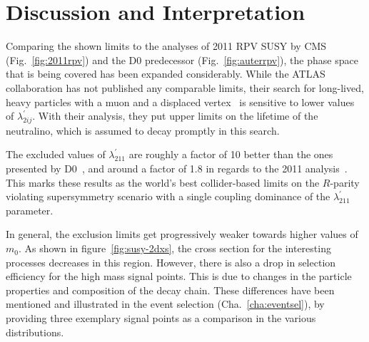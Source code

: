 \section{Discussion and Interpretation}
\label{sec:discussion}

Comparing the shown limits to the analyses of 2011 RPV SUSY by CMS (Fig.~\ref{fig:2011rpv}) and the D0 predecessor (Fig.~\ref{fig:auterrpv}), the phase space that is being covered has been expanded considerably. While the ATLAS collaboration has not published any comparable limits, their search for long-lived, heavy particles with a muon and a displaced vertex~\cite{atlasrpv} is sensitive to lower values of $\lambda^\prime_{2ij}$. With their analysis, they put upper limits on the lifetime of the neutralino, which is assumed to decay promptly in this search.

The excluded values of $\lambda^{\prime}_{211}$ are roughly a factor of 10 better than the ones presented by D0~\cite{auter,d0rpv}, and around a factor of 1.8 in regards to the 2011 analysis~\cite{2011rpv}. This marks these results as the world's best collider-based limits on the $R$-parity violating supersymmetry scenario with a single coupling dominance of the $\lambda^{\prime}_{211}$ parameter.

In general, the exclusion limits get progressively weaker towards higher values of $m_0$. As shown in figure~\ref{fig:susy-2dxs}, the cross section for the interesting processes decreases in this region. However, there is also a drop in selection efficiency for the high mass signal points. This is due to changes in the particle properties and composition of the decay chain. These differences have been mentioned and illustrated in the event selection (Cha.~\ref{cha:eventsel}), by providing three exemplary signal points as a comparison in the various distributions.

